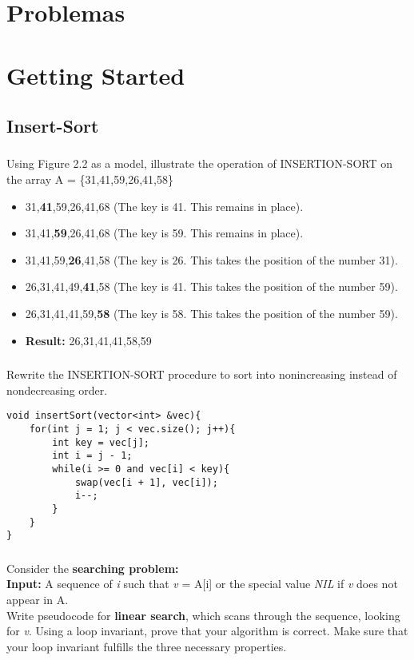 \documentclass[a4paper,12pt]{article}
\begin{document}
\section{Problemas}
\section{Getting Started}
  \subsection{Insert-Sort}
    \subsubsection{} Using Figure 2.2 as a model, illustrate the operation of INSERTION-SORT on the
    array \hspace{3mm}  A = \{31,41,59,26,41,58\} \\
    \begin{itemize}
     \item 31,\textbf{41},59,26,41,68   (The key is 41. This remains in place).
     \item 31,41,\textbf{59},26,41,68   (The key is 59. This remains in place).
     \item 31,41,59,\textbf{26},41,58   (The key is 26. This takes the position of the number 31).
     \item 26,31,41,49,\textbf{41},58   (The key is 41. This takes the position of the number 59).
     \item 26,31,41,41,59,\textbf{58}   (The key is 58. This takes the position of the number 59).
     \item \textbf{Result: } 26,31,41,41,58,59
    \end{itemize}
    \subsubsection{} Rewrite the INSERTION-SORT procedure to sort into nonincreasing instead of 
    nondecreasing order. \\
    \begin{lstlisting}
void insertSort(vector<int> &vec){
	for(int j = 1; j < vec.size(); j++){
		int key = vec[j];
		int i = j - 1;
		while(i >= 0 and vec[i] < key){
			swap(vec[i + 1], vec[i]);
			i--;
		}
	}
}
    \end{lstlisting}

    \subsubsection{} Consider the \textbf{searching problem:} \\
    \textbf{Input: } A sequence of \textit{i} such that \textit{v}
    = A[i] or the special value \textit{NIL} if \textit{v} does not appear in A.\\
    Write pseudocode for \textbf{linear search}, which scans through the sequence, looking
    for \textit{v}. Using a loop invariant, prove that your algorithm is correct. Make sure that
    your loop invariant fulfills the three necessary properties.\\
    
\end{document}
